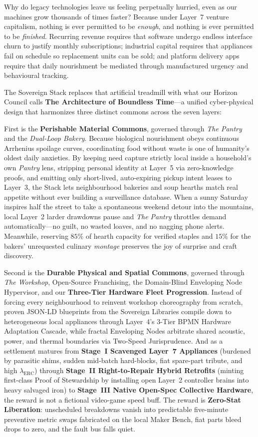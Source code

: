 Why do legacy technologies leave us feeling perpetually hurried, even as our machines grow thousands of times faster? Because under Layer~7 venture capitalism, nothing is ever permitted to be \textit{enough}, and nothing is ever permitted to be \textit{finished}. Recurring revenue requires that software undergo endless interface churn to justify monthly subscriptions; industrial capital requires that appliances fail on schedule so replacement units can be sold; and platform delivery apps require that daily nourishment be mediated through manufactured urgency and behavioural tracking.

The Sovereign Stack replaces that artificial treadmill with what our Horizon Council calls \textbf{The Architecture of Boundless Time}---a unified cyber-physical design that harmonizes three distinct commons across the seven layers:

First is the \textbf{Perishable Material Commons}, governed through \textit{The Pantry} and the \textit{Dual-Loop Bakery}. Because biological nourishment obeys continuous Arrhenius spoilage curves, coordinating food without waste is one of humanity's oldest daily anxieties. By keeping need capture strictly local inside a household's own \textit{Pantry} lens, stripping personal identity at Layer~5 via zero-knowledge proofs, and emitting only short-lived, auto-expiring pickup intent leases to Layer~3, the Stack lets neighbourhood bakeries and soup hearths match real appetite without ever building a surveillance database. When a sunny Saturday inspires half the street to take a spontaneous weekend detour into the mountains, local Layer~2 larder drawdowns pause and \textit{The Pantry} throttles demand automatically---no guilt, no wasted loaves, and no nagging phone alerts. Meanwhile, reserving $85\%$ of hearth capacity for verified staples and $15\%$ for the bakers' unrequested culinary \textit{montage} preserves the joy of surprise and craft discovery.

Second is the \textbf{Durable Physical and Spatial Commons}, governed through \textit{The Workshop}, Open-Source Franchising, the Domain-Blind Enveloping Node Hypervisor, and our \textbf{Three-Tier Hardware Fleet Progression}. Instead of forcing every neighbourhood to reinvent workshop choreography from scratch, proven JSON-LD blueprints from the Sovereign Libraries compile down to heterogeneous local appliances through Layer~4's 3-Tier BPMN Hardware Adaptation Cascade, while fractal Enveloping Nodes arbitrate shared acoustic, power, and thermal boundaries via Two-Speed Jurisprudence. And as a settlement matures from \textbf{Stage~I Scavenged Layer~7 Appliances} (burdened by parasitic shims, sudden mid-batch hard-blocks, fiat spare-part tribute, and high $\lambda_{\mathrm{ERC}}$) through \textbf{Stage~II Right-to-Repair Hybrid Retrofits} (minting first-class Proof of Stewardship by installing open Layer~2 controller brains into heavy salvaged iron) to \textbf{Stage~III Native Open-Spec Collective Hardware}, the reward is not a fictional video-game speed buff. The reward is \textbf{Zero-Stat Liberation}: unscheduled breakdowns vanish into predictable five-minute preventive metric swaps fabricated on the local Maker Bench, fiat parts bleed drops to zero, and the fault bus falls quiet.

